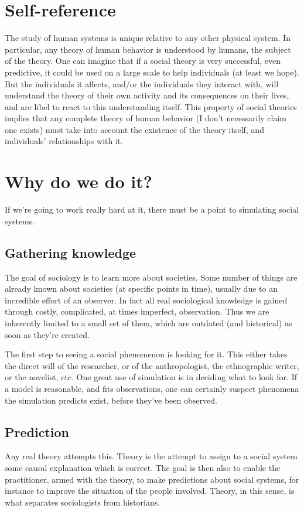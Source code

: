 \documentclass[]{article}
\begin{document}
	\section{Self-reference}
	The study of human systems is unique relative to any other physical system.
	In particular, any theory of human behavior is understood by humans, the subject of the theory.
	One can imagine that if a social theory is very successful, even predictive, it could be used on a large scale to help individuals (at least we hope).
	But the individuals it affects, and/or the individuals they interact with, will understand the theory of their own activity and its consequences on their lives, and are libel to react to this understanding itself.
	This property of social theories implies that any complete theory of human behavior (I don't necessarily claim one exists) must take into account the existence of the theory itself, and individuals' relationships with it.
	
	\section{Why do we do it?}
	If we're going to work really hard at it, there must be a point to
	simulating social systems.
	
	\subsection{Gathering knowledge}
	The goal of sociology is to learn more about societies.
	Some number of things are already known about societies (at specific
	points in time), usually due to an incredible effort of an observer.
	In fact all real sociological knowledge is gained through costly,
	complicated, at times imperfect, observation.
	Thus we are inherently limited to a small set of them, which are
	outdated (and historical) as soon as they're created.
	
	The first step to seeing a social phenomenon is looking for it.
	This either takes the direct will of the researcher, or of the
	anthropologist, the ethnographic writer, or the novelist, etc.
	One great use of simulation is in deciding what to look for.
	If a model is reasonable, and fits observations, one can certainly
	suspect phenomena the simulation predicts exist, before they've been
	observed.
	
	\subsection{Prediction}
	Any real theory attempts this.
	Theory is the attempt to assign to a social system some causal
	explanation which is correct.
	The goal is then also to enable the practitioner, armed with the
	theory, to make predictions about social systems, for instance to
	improve the situation of the people involved.
	Theory, in this sense, is what separates sociologists from historians.
	
	
	
\end{document}

